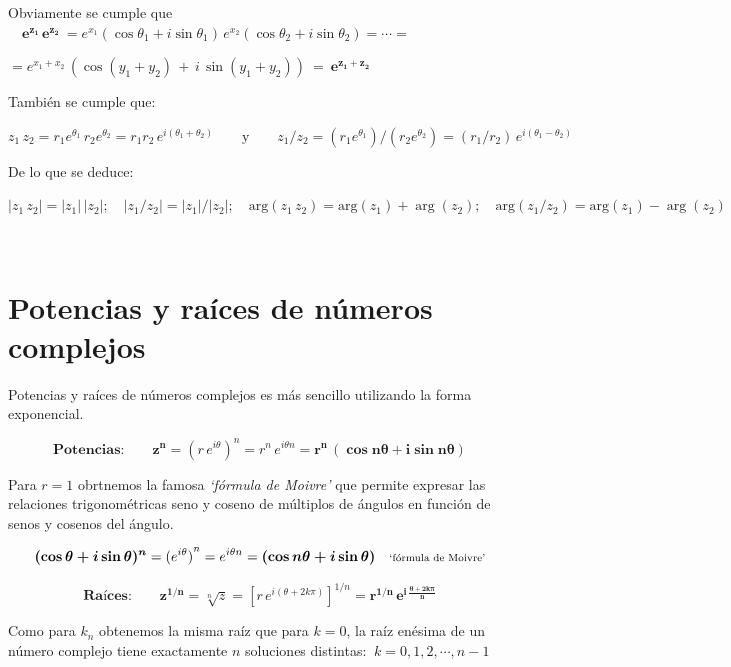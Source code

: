 Obviamente se cumple que $\quad  \boldsymbol{e^{z_1} \, e^{z_2}} \ = e^{x_1} (\cos {\theta_1}+i \sin {\theta_1})\, e^{x_2} (\cos {\theta_2}+i \sin {\theta_2})= \cdots = $

$=e^{x_1+x_2} \, \left( \cos(y_1+y_2)\, +\, i\, \sin(y_1+y_2) \right) \ = \ \boldsymbol{e^{z_1+z_2}}$


También se cumple que: 

$z_1\, z_2=r_1 e^{\theta_1} \, r_2 e^{\theta_2}=r_1 r_2 \, e^{i(\theta_1+\theta_2)} \qquad \text{y} \qquad z_1 / z_2=(r_1 e^{\theta_1}) / (r_2 e^{\theta_2})= (r_1 / r_2) \, e^{i(\theta_1-\theta_2)}$

De lo que se deduce:

\begin{small}
$|z_1\, z_2|=|z_1|\, |z_2|; \quad |z_1/z_2|=|z_1|/|z_2|;\quad \mathrm{arg}(z_1\, z_2)=\mathrm{arg}(z_1)+\arg(z_2); \quad \mathrm{arg}(z_1/ z_2)=\mathrm{arg}(z_1)-\arg(z_2)$
\end{small}\normalsize{\textcolor{white}{.}}

\section{Potencias y raíces de números complejos}
\vspace{0.5cm}

Potencias y raíces de números complejos es más sencillo utilizando la forma exponencial.

\begin{cuadro-naranja}
	$$\textbf{Potencias:} \qquad \boldsymbol{ z^n }={(r\, e^{i\theta})}^n=r^n\, e^{i\theta n} = \boldsymbol{ r^n\, (\cos n \theta + i\sin n\theta) }$$
	
Para $r=1$ obrtnemos la famosa \emph{`fórmula de Moivre'} que permite expresar las relaciones trigonométricas seno y coseno de múltiplos de ángulos en función de senos y cosenos del ángulo.

\vspace{-5mm}
$$ \boldsymbol{ (\cos \theta + i \sin \theta)^n }={(e^{i\theta})}^n =e^{i\theta n} =\boldsymbol{ (\cos n\theta + i \sin \theta) } \quad \scriptsize{\text{`fórmula de Moivre'}}$$ 

$$\textbf{Raíces:} \qquad \boldsymbol{ z^{1/n} }= \sqrt[n]{z}={\left[ r\, e^{i(\theta+2k \pi)} \right]}^{1/n}=  \boldsymbol{r^{1/n}\, e^{i\, \frac{\theta +2k\pi}{n}}  }$$

Como para $k_n$ obtenemos la misma raíz que para $k=0$, la raíz enésima de un número complejo tiene exactamente $n$ soluciones distintas: $\ k=0,1,2,\cdots , n-1$

\end{cuadro-naranja}


